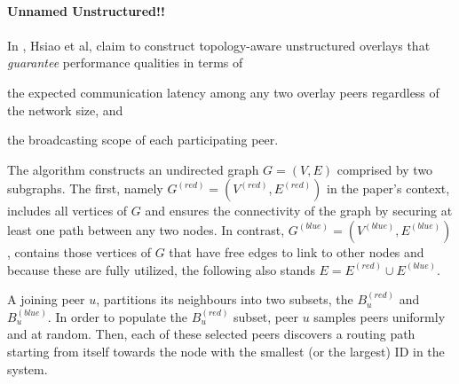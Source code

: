 \documentclass[acmcsur]{acmtrans2m}
\begin{document}
%
%

\paragraph*{\textbf{Unnamed Unstructured!!\\}}

\paragraph{}
In \cite{hsiao_redblue_2009}, Hsiao et al, claim to construct topology-aware unstructured overlays that \emph{guarantee} performance qualities in terms of
\begin{inparaenum}
  \item the expected communication latency among any two overlay peers regardless of the network size, and
  \item the broadcasting scope of each participating peer.
\end{inparaenum}

The algorithm constructs an undirected graph $G = \left( V, E \right)$ comprised by two subgraphs. The first, namely $G^{\left( red \right)} = \left( V^{\left( red \right)}, E^{\left( red \right)} \right)$ in the paper's context, includes all vertices of $G$ and ensures the connectivity of the graph by securing at least one path between any two nodes. In contrast, $G^{\left( blue \right)} = \left( V^{\left( blue \right)}, E^{\left( blue \right)} \right)$, contains those vertices of $G$ that have free edges to link to other nodes and because these are fully utilized, the following also stands $E = E^{\left( red \right)} \cup E^{\left( blue \right)}$.

A joining peer $u$, partitions its neighbours into two subsets, the $B_u^{\left( red \right)}$ and $B_u^{\left( blue \right)}$. In order to populate the $B_u^{\left( red \right)}$ subset, peer $u$ samples peers uniformly and at random. Then, each of these selected peers discovers a routing path starting from itself towards the node with the smallest (or the largest) ID in the system.
\end{document}
